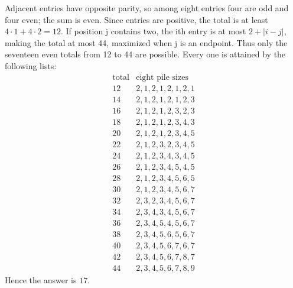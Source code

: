 Adjacent entries have opposite parity, so among eight entries four are odd and four even; the sum is even. Since entries are positive, the total is at least $4\cdot1+4\cdot2=12$. If position j contains two, the ith entry is at most $2+|i-j|$, making the total at most 44, maximized when j is an endpoint. Thus only the seventeen even totals from 12 to 44 are possible. Every one is attained by the following lists:
\[\begin{array}{c|l}\text{total}&\text{eight pile sizes}\\12&2,1,2,1,2,1,2,1\\
14&2,1,2,1,2,1,2,3\\
16&2,1,2,1,2,3,2,3\\
18&2,1,2,1,2,3,4,3\\
20&2,1,2,1,2,3,4,5\\
22&2,1,2,3,2,3,4,5\\
24&2,1,2,3,4,3,4,5\\
26&2,1,2,3,4,5,4,5\\
28&2,1,2,3,4,5,6,5\\
30&2,1,2,3,4,5,6,7\\
32&2,3,2,3,4,5,6,7\\
34&2,3,4,3,4,5,6,7\\
36&2,3,4,5,4,5,6,7\\
38&2,3,4,5,6,5,6,7\\
40&2,3,4,5,6,7,6,7\\
42&2,3,4,5,6,7,8,7\\
44&2,3,4,5,6,7,8,9\end{array}\]
Hence the answer is $\boxed{17}$.
